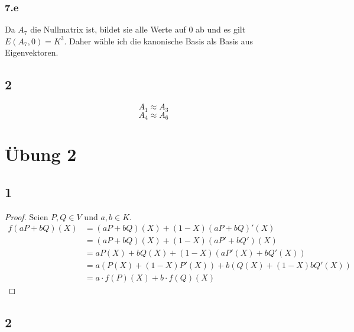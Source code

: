 \documentclass[10pt,a4paper]{article}
\begin{document}
\subsubsection*{7.e}

Da $A_{7}$ die Nullmatrix ist, bildet sie alle Werte auf $0$ ab und es gilt $E(A_{7}, 0) = K^{3}$.
Daher wähle ich die kanonische Basis als Basis aus Eigenvektoren.

\subsection*{2}

\begin{equation}
A_{1} \approx A_{3}
\end{equation}
\begin{equation}
A_{4} \approx A_{6}
\end{equation}

\section*{Übung 2}

\subsection*{1}

\begin{proof}
Seien $P, Q \in V$ und $a, b \in K$.
\begin{align}
f(aP + bQ)(X) & = (aP + bQ)(X) + (1 - X)(aP + bQ)'(X)\\
& = (aP + bQ)(X) + (1 - X)(aP' + bQ')(X)\\
& = aP(X) + bQ(X) + (1 - X) \left( aP'(X) + bQ'(X) \right)\\
& = a \left( P(X) + (1 - X)P'(X) \right) + b \left( Q(X) + (1 - X)bQ'(X) \right)\\
& = a \cdot f(P)(X) + b \cdot f(Q)(X)
\end{align}
\end{proof}

\subsection*{2}
\end{document}
